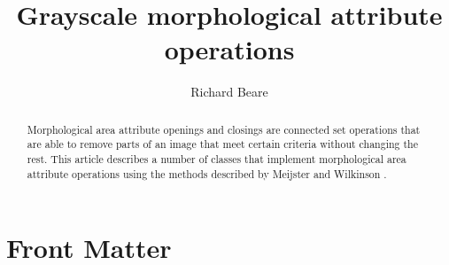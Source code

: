 \documentclass{InsightArticle}
\title{Grayscale morphological attribute operations}
\author{Richard Beare}
\begin{document}
\maketitle

\ifhtml
\chapter*{Front Matter\label{front}}
\fi


\begin{abstract}
\noindent
Morphological area attribute openings and closings\cite{Cheng92,Vincent93a} are connected set
operations that are able to remove parts of an image that meet certain
criteria without changing the rest. This article describes a number of
classes that implement morphological area attribute operations using
the methods described by Meijster and Wilkinson \cite{meijster02}.
\end{abstract}

\tableofcontents






\end{document}

